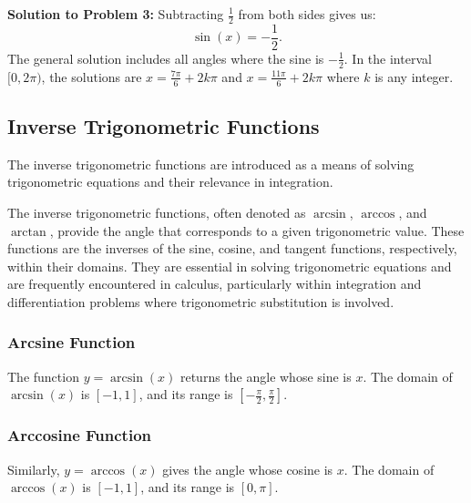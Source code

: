 \documentclass[a4paper,12pt]{book}
\newcounter{problem}
\begin{document}
\textbf{Solution to Problem 3:} Subtracting \( \frac{1}{2} \) from both sides gives us:
\[
\sin(x) = -\frac{1}{2}.
\]
The general solution includes all angles where the sine is \( -\frac{1}{2} \). In the interval \( [0, 2\pi) \), the solutions are \( x = \frac{7\pi}{6} + 2k\pi \) and \( x = \frac{11\pi}{6} + 2k\pi \) where \( k \) is any integer.





\subsection{Inverse Trigonometric Functions}
\label{subsec:inverse_trig_functions}

The inverse trigonometric functions are introduced as a means of solving trigonometric equations and their relevance in integration.

The inverse trigonometric functions, often denoted as $\arcsin$, $\arccos$, and $\arctan$, provide the angle that corresponds to a given trigonometric value. These functions are the inverses of the sine, cosine, and tangent functions, respectively, within their domains. They are essential in solving trigonometric equations and are frequently encountered in calculus, particularly within integration and differentiation problems where trigonometric substitution is involved.

\subsubsection{Arcsine Function}
The function $y = \arcsin(x)$ returns the angle whose sine is $x$. The domain of $\arcsin(x)$ is $[-1,1]$, and its range is $\left[-\frac{\pi}{2}, \frac{\pi}{2}\right]$.

\subsubsection{Arccosine Function}
Similarly, $y = \arccos(x)$ gives the angle whose cosine is $x$. The domain of $\arccos(x)$ is $[-1,1]$, and its range is $[0, \pi]$.
\end{document}
